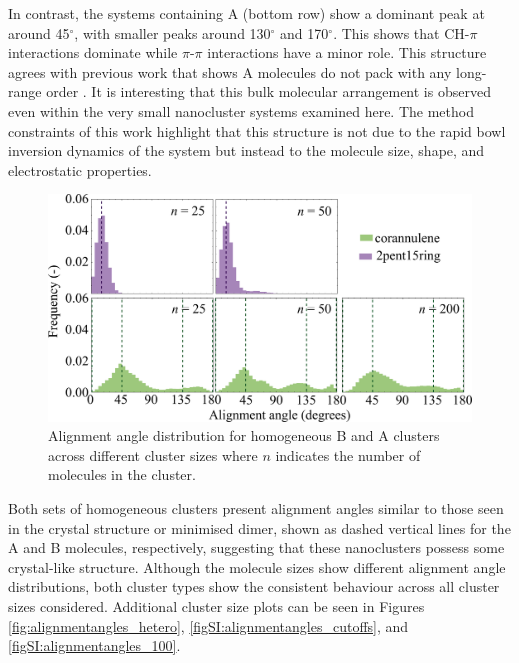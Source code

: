 In contrast, the systems containing A (bottom row) show a dominant peak at around 45$^{\circ}$, with smaller peaks around 130$^{\circ}$ and 170$^{\circ}$. This shows that CH-$\pi$ interactions dominate while $\pi$-$\pi$ interactions have a minor role. This structure agrees with previous work that shows A molecules do not pack with any long-range order \cite{hanson1976crystal,Petrukhina2005,kanao2018differentiating,wang2015electronic,scott1999geodesic}. It is interesting that this bulk molecular arrangement is observed even within the very small nanocluster systems examined here. The method constraints of this work highlight that this structure is not due to the rapid bowl inversion dynamics of the system but instead to the molecule size, shape, and electrostatic properties.
%
\begin{figure}[!tbh]
\centering
\includegraphics[width=0.5\linewidth]{Figures/alignment_angle_homo_draft.png}
\caption{Alignment angle distribution for homogeneous B and A clusters across different cluster sizes where $n$ indicates the number of molecules in the cluster.}
\label{fig:alignmentangles_homo}
\end{figure}
%
Both sets of homogeneous clusters present alignment angles similar to those seen in the crystal structure or minimised dimer, shown as dashed vertical lines for the A and B molecules, respectively, suggesting that these nanoclusters possess some crystal-like structure.  Although the molecule sizes show different alignment angle distributions, both cluster types show the consistent behaviour across all cluster sizes considered. Additional cluster size plots can be seen in Figures \ref{fig:alignmentangles_hetero}, \ref{figSI:alignmentangles_cutoffs}, and \ref{figSI:alignmentangles_100}.

